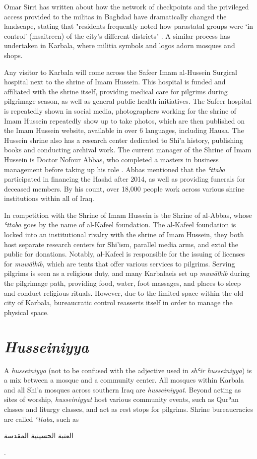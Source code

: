 Omar Sirri has written about how the network of checkpoints and the privileged access provided to the militas in Baghdad have dramatically changed the landscape, stating that "residents frequently noted how parastatal groups were ‘in control’ (msaitreen) of the city’s different districts" \cite[14]{omar_sirri_destructive_2021}. A similar process has undertaken in Karbala, where militia symbols and logos adorn mosques and shops. 

Any visitor to Karbala will come across the Safeer Imam al-Hussein Surgical hospital next to the shrine of Imam Hussein. This hospital is funded and affiliated with the shrine itself, providing medical care for pilgrims during pilgrimage season, as well as general public health initiatives. The Safeer hospital is repeatedly shown in social media, photographers working for the shrine of Imam Hussein repeatedly show up to take photos, which are then published on the Imam Hussein website, available in over 6 languages, including Hausa. The Hussein shrine also has a research center dedicated to Shi'a history, publishing books and conducting archival work. The current manager of the Shrine of Imam Hussein is Doctor Nofour Abbas, who completed a masters in business management before taking up his role \cite{nofour_abbas_interview_2021}. Abbas mentioned that the \emph{ʿttaba} participated in financing the Hashd after 2014, as well as providing funerals for deceased members. By his count, over 18,000 people work across various shrine institutions within all of Iraq. 

In competition with the Shrine of Imam Hussein is the Shrine of al-Abbas, whose \emph{ʿttaba} goes by the name of al-Kafeel foundation. The al-Kafeel foundation is locked into an institutional rivalry with the shrine of Imam Hussein, they both host separate research centers for Shi'ism, parallel media arms, and extol the public for donations. Notably, al-Kafeel is responsible for the issuing of licenses for \emph{muwālkib}, which are tents that offer various services to pilgrims. Serving pilgrims is seen as a religious duty, and many Karbalaeis set up \emph{muwālkib} during the pilgrimage path, providing food, water, foot massages, and places to sleep and conduct religious rituals. However, due to the limited space within the old city of Karbala, bureaucratic control reasserts itself in order to manage the physical space. 

\section{\emph{Husseiniyya}}
A \emph{husseiniyya} (not to be confused with the adjective used in \emph{shʿir husseiniyya}) is a mix between a mosque and a community center. All mosques within Karbala and all Shi'a mosques across southern Iraq are \emph{husseiniyyat}. Beyond acting as sites of worship, \emph{husseiniyyat} host various community events, such as Qurʾan classes and liturgy classes, and act as rest stops for pilgrims. Shrine bureaucracies are called \emph{ʿttaba}, such as 
\begin{Arabic}
العتبة الحسينية المقدسة
\end{Arabic}.

